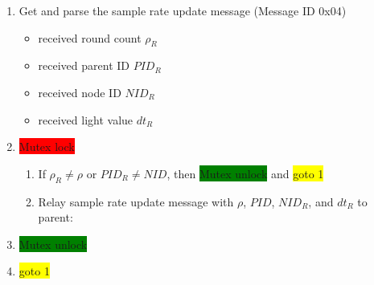 \documentclass[letterpaper,10pt]{article}
\begin{document}
\begin{enumerate}
	\item Get and parse the sample rate update message (Message ID 0x04)
	\begin{itemize}
		\item received round count $\rho_R$
		\item received parent ID $PID_R$
		\item received node ID $NID_R$
		\item received light value $dt_R$
	\end{itemize}
	\item \colorbox{red}{Mutex lock}
	\begin{enumerate}
		\item If $\rho_R \neq \rho$ or $PID_R \neq NID$, then \colorbox{green}{Mutex unlock} and \colorbox{yellow}{goto 1}
		\item Relay sample rate update message with $\rho$, $PID$, $NID_R$, and $dt_R$ to parent:\\
	\end{enumerate}
	\item \colorbox{green}{Mutex unlock}
	\item \colorbox{yellow}{goto 1}
\end{enumerate}
\end{document}
